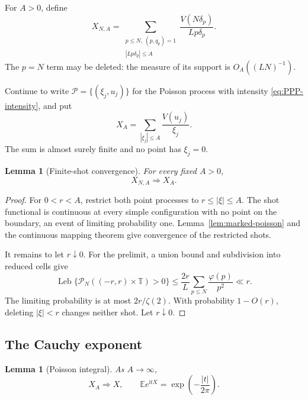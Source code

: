 \documentclass[11pt]{article}
\numberwithin{equation}{section}
\newtheorem{lemma}[theorem]{Lemma}
\theoremstyle{definition}
\newcommand{\T}{\mathbb T}
\newcommand{\E}{\mathbb E}
\newcommand{\1}{\mathbf 1}
\newcommand{\ii}{\mathrm i}
\newcommand{\Leb}{\operatorname{Leb}}
\begin{document}
For \(A>0\), define
\begin{equation}\label{eq:XNA}
 X_{N,A}=
 \sum_{\substack{p\le N,\ (p,q_p)=1\\|Lp\delta_p|\le A}}
 \frac{V(N\delta_p)}{Lp\delta_p}.
\end{equation}
The \(p=N\) term may be deleted: the measure of its support is
\(O_A((LN)^{-1})\).

Continue to write \(\mathcal P=\{(\xi_j,u_j)\}\) for the Poisson process with
intensity \eqref{eq:PPP-intensity}, and put
\begin{equation}\label{eq:XA}
 X_A=\sum_{|\xi_j|\le A}\frac{V(u_j)}{\xi_j}.
\end{equation}
The sum is almost surely finite and no point has \(\xi_j=0\).

\begin{lemma}[Finite-shot convergence]\label{lem:finite-shot}
For every fixed \(A>0\),
\[
 X_{N,A}\Longrightarrow X_A.
\]
\end{lemma}

\begin{proof}
For \(0<r<A\), restrict both point processes to
\(r\le|\xi|\le A\).  The shot functional is continuous at every simple
configuration with no point on the boundary, an event of limiting
probability one.  Lemma~\ref{lem:marked-poisson} and the continuous
mapping theorem give convergence of the restricted shots.

It remains to let \(r\downarrow0\).  For the prelimit, a union bound and
subdivision into reduced cells give
\[
 \Leb\{\mathcal P_N((-r,r)\times\T)>0\}
 \le
 \frac{2r}{L}\sum_{p\le N}\frac{\varphi(p)}{p^2}
 \ll r.
\]
The limiting probability is at most
\(2r/\zeta(2)\).  With probability \(1-O(r)\), deleting
\(|\xi|<r\) changes neither shot.  Let \(r\downarrow0\).
\end{proof}

\subsection{The Cauchy exponent}

\begin{lemma}[Poisson integral]\label{lem:poisson-Cauchy}
As \(A\to\infty\),
\[
 X_A\Longrightarrow X,\qquad
 \E e^{\ii tX}=\exp\left(-\frac{|t|}{2\pi}\right).
\]
\end{lemma}
\end{document}
